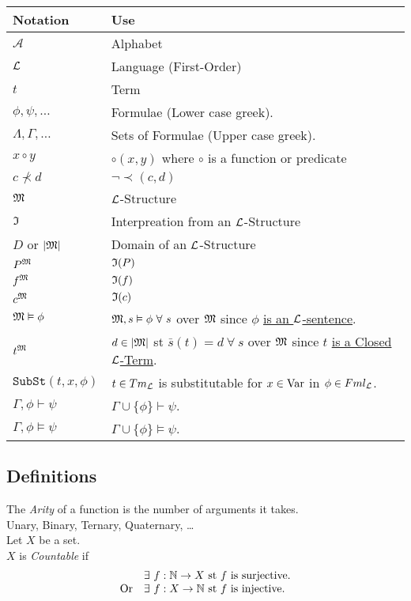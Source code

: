 \documentclass[11pt,a4paper]{article}
\begin{document}
\begin{center}\begin{tabular}{|l|l|}
\hline
\textbf{Notation}&\textbf{Use}\\
\hline$\mathcal{A}$&Alphabet\\
$\mathcal{L}$&Language (First-Order)\\
$t$&Term\\
$\phi,\psi,\dots$&Formulae (Lower case greek).\\
$\Lambda,\Gamma,\dots$&Sets of Formulae (Upper case greek).\\
$x\circ y$&$\circ(x,y)$ where $\circ$ is a function or predicate\\
$c\not\prec d$&$\neg\prec(c,d)$\\
$\mathfrak{M}$&$\mathcal{L}$-Structure\\
$\mathfrak{I}$&Interpreation from an $\mathcal{L}$-Structure\\
$D$ or $|\mathfrak{M}|$&Domain of an $\mathcal{L}$-Structure\\
$P^{\mathfrak{M}}$&$\mathfrak{I}(P)$\\
$f^{\mathfrak{M}}$&$\mathfrak{I}(f)$\\
$c^{\mathfrak{M}}$&$\mathfrak{I}(c)$\\
$\mathfrak{M}\vDash\phi$&$\M,s\vDash\phi\ \forall\ s$ over $\mathfrak{M}$ since $\phi$ \underline{is an $\mathcal{L}$-sentence}.\\
$t^{\mathfrak{M}}$&$d\in|\mathfrak{M}|$ st $\bar{s}(t)=d\ \forall\ s$ over $\mathfrak{M}$ since $t$ \underline{is a Closed $\mathcal{L}$-Term}.\\
$\mathtt{SubSt}(t,x,\phi)$&$t\in Tm_{\mathcal{L}}$ is substitutable for $x\in\mathrm{Var}$ in $\phi\in Fml_{\mathcal{L}}$.\\
$\Gamma,\phi\vdash\psi$&$\Gamma\cup\{\phi\}\vdash\psi$.\\
$\Gamma,\phi\vDash\psi$&$\Gamma\cup\{\phi\}\vDash\psi$.\\
\hline
\end{tabular}\end{center}
 
\subsection{Definitions}

The \textit{Arity} of a function is the number of arguments it takes.\\
\nb Unary, Binary, Ternary, Quaternary, \dots\\

Let $X$ be a set.\\
$X$ is \textit{Countable} if
\[\begin{array}{rl}
&\exists\ f:\mathbb{N}\to X\text{ st }f\text{ is surjective}.\\
\text{Or}&\exists\ f:X\to\mathbb{N}\text{ st }f\text{ is injective}.
\end{array}\]
\end{document}
